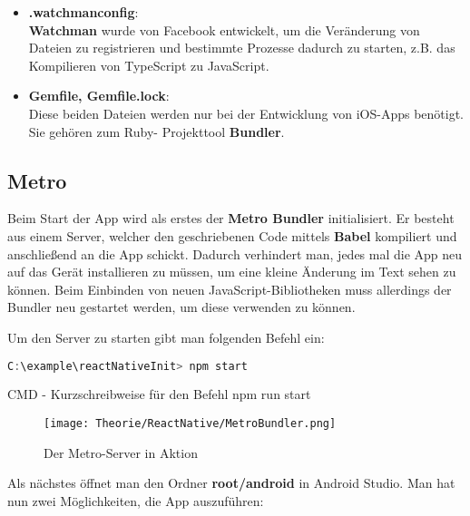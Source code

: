 \begin{itemize}
\item \textbf{.watchmanconfig}:\\
\textbf{Watchman} wurde von Facebook entwickelt, um die Veränderung von Dateien zu registrieren und bestimmte
Prozesse dadurch zu starten, z.B. das Kompilieren von TypeScript zu JavaScript.

\item \textbf{Gemfile, Gemfile.lock}:\\
Diese beiden Dateien werden nur bei der Entwicklung von iOS-Apps benötigt. Sie gehören zum Ruby-
Projekttool \textbf{Bundler}.

\end{itemize}

\newpage
\subsection{Metro}
\label{metrobundler}
Beim Start der App wird als erstes der \textbf{Metro Bundler} initialisiert. Er besteht aus einem Server,
welcher den geschriebenen Code mittels \textbf{Babel} kompiliert und anschließend an die App schickt. Dadurch
verhindert man, jedes mal die App neu auf das Gerät installieren zu müssen, um eine kleine Änderung
im Text sehen zu können. Beim Einbinden von neuen JavaScript-Bibliotheken muss allerdings der
Bundler neu gestartet werden, um diese verwenden zu können.

Um den Server zu starten gibt man folgenden Befehl ein:

\begin{code}[htp]
\begin{lstlisting}[firstnumber=1,language=JavaScript, style=CMD]
C:\example\reactNativeInit> npm start
\end{lstlisting}
\caption{CMD - Kurzschreibweise für den Befehl npm run start}
\end{code}

\begin{figure}[H]
  \begin{center}
    \texttt{[image: Theorie/ReactNative/MetroBundler.png]}
    \caption{Der Metro-Server in Aktion}
  \end{center}
\end{figure}

\newpage
Als nächstes öffnet man den Ordner \textbf{root/android} in Android Studio. Man hat nun zwei Möglichkeiten,
die App auszuführen:

